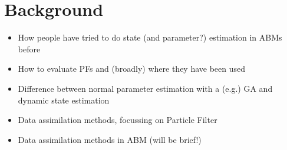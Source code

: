 \section{Background\label{background}}

\begin{itemize}
\item How people have tried to do state (and parameter?) estimation in ABMs before
\item How to evaluate PFs and (broadly) where they have been used
\item Difference between normal parameter estimation with a (e.g.) GA and dynamic state estimation
\item Data assimilation methods, focussing on Particle Filter
\item Data assimilation methods in ABM (will be brief!)
\end{itemize}

